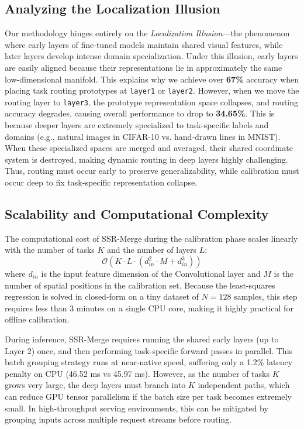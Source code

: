 \documentclass{article}
\theoremstyle{plain}
\theoremstyle{definition}
\theoremstyle{remark}
\begin{document}
\subsection{Analyzing the Localization Illusion}
Our methodology hinges entirely on the \textit{Localization Illusion}---the phenomenon where early layers of fine-tuned models maintain shared visual features, while later layers develop intense domain specialization. Under this illusion, early layers are easily aligned because their representations lie in approximately the same low-dimensional manifold. This explains why we achieve over \textbf{67\%} accuracy when placing task routing prototypes at \texttt{layer1} or \texttt{layer2}. 
However, when we move the routing layer to \texttt{layer3}, the prototype representation space collapses, and routing accuracy degrades, causing overall performance to drop to \textbf{34.65\%}. This is because deeper layers are extremely specialized to task-specific labels and domains (e.g., natural images in CIFAR-10 vs. hand-drawn lines in MNIST). When these specialized spaces are merged and averaged, their shared coordinate system is destroyed, making dynamic routing in deep layers highly challenging. Thus, routing must occur early to preserve generalizability, while calibration must occur deep to fix task-specific representation collapse.

\subsection{Scalability and Computational Complexity}
The computational cost of SSR-Merge during the calibration phase scales linearly with the number of tasks $K$ and the number of layers $L$:
\begin{equation}
\mathcal{O}(K \cdot L \cdot (d_{in}^2 \cdot M + d_{in}^3))
\end{equation}
where $d_{in}$ is the input feature dimension of the Convolutional layer and $M$ is the number of spatial positions in the calibration set. Because the least-squares regression is solved in closed-form on a tiny dataset of $N=128$ samples, this step requires less than 3 minutes on a single CPU core, making it highly practical for offline calibration.

During inference, SSR-Merge requires running the shared early layers (up to Layer 2) once, and then performing task-specific forward passes in parallel. This batch grouping strategy runs at near-native speed, suffering only a 1.2\% latency penalty on CPU (46.52 ms vs 45.97 ms). However, as the number of tasks $K$ grows very large, the deep layers must branch into $K$ independent paths, which can reduce GPU tensor parallelism if the batch size per task becomes extremely small. In high-throughput serving environments, this can be mitigated by grouping inputs across multiple request streams before routing.
\end{document}
